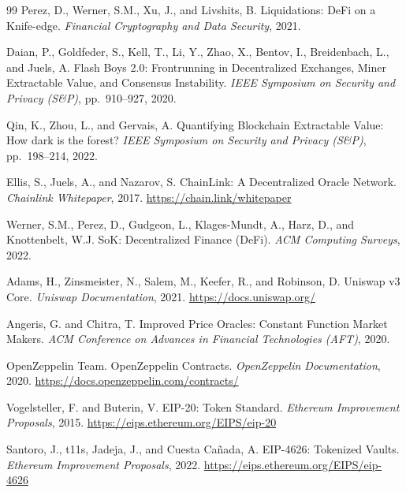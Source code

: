 \documentclass[10pt,a4paper,twocolumn]{article}
\begin{document}
\begin{thebibliography}{99}
Perez, D., Werner, S.M., Xu, J., and Livshits, B.
\newblock Liquidations: DeFi on a Knife-edge.
\newblock \emph{Financial Cryptography and Data Security}, 2021.

Daian, P., Goldfeder, S., Kell, T., Li, Y., Zhao, X., Bentov, I., Breidenbach, L., and Juels, A.
\newblock Flash Boys 2.0: Frontrunning in Decentralized Exchanges, Miner Extractable Value, and Consensus Instability.
\newblock \emph{IEEE Symposium on Security and Privacy (S\&P)}, pp.~910--927, 2020.

Qin, K., Zhou, L., and Gervais, A.
\newblock Quantifying Blockchain Extractable Value: How dark is the forest?
\newblock \emph{IEEE Symposium on Security and Privacy (S\&P)}, pp.~198--214, 2022.

Ellis, S., Juels, A., and Nazarov, S.
\newblock ChainLink: A Decentralized Oracle Network.
\newblock \emph{Chainlink Whitepaper}, 2017.
\newblock \url{https://chain.link/whitepaper}

Werner, S.M., Perez, D., Gudgeon, L., Klages-Mundt, A., Harz, D., and Knottenbelt, W.J.
\newblock SoK: Decentralized Finance (DeFi).
\newblock \emph{ACM Computing Surveys}, 2022.

Adams, H., Zinsmeister, N., Salem, M., Keefer, R., and Robinson, D.
\newblock Uniswap v3 Core.
\newblock \emph{Uniswap Documentation}, 2021.
\newblock \url{https://docs.uniswap.org/}

Angeris, G. and Chitra, T.
\newblock Improved Price Oracles: Constant Function Market Makers.
\newblock \emph{ACM Conference on Advances in Financial Technologies (AFT)}, 2020.

OpenZeppelin Team.
\newblock OpenZeppelin Contracts.
\newblock \emph{OpenZeppelin Documentation}, 2020.
\newblock \url{https://docs.openzeppelin.com/contracts/}

Vogelsteller, F. and Buterin, V.
\newblock EIP-20: Token Standard.
\newblock \emph{Ethereum Improvement Proposals}, 2015.
\newblock \url{https://eips.ethereum.org/EIPS/eip-20}

Santoro, J., t11s, Jadeja, J., and Cuesta Ca\~{n}ada, A.
\newblock EIP-4626: Tokenized Vaults.
\newblock \emph{Ethereum Improvement Proposals}, 2022.
\newblock \url{https://eips.ethereum.org/EIPS/eip-4626}


\end{thebibliography}
\end{document}
